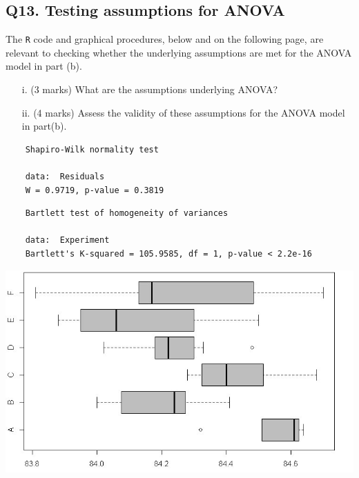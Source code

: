 \documentclass[a4paper,12pt]{article}
\begin{document}
\newpage
\subsection*{Q13. Testing assumptions for ANOVA } %
The \texttt{R} code and graphical procedures, below and on the following page, are relevant to checking whether the underlying assumptions are met for the ANOVA model in part (b).
\begin{itemize}
	\item[i.] (3 marks) What are the assumptions underlying ANOVA?
	\item[ii.] (4 marks)  Assess the validity of these assumptions for the ANOVA model in part(b).
	
\end{itemize}
\begin{framed}
	\begin{verbatim}
	Shapiro-Wilk normality test
	
	data:  Residuals
	W = 0.9719, p-value = 0.3819
	\end{verbatim}
\end{framed}
\begin{framed}
	\begin{verbatim}
	Bartlett test of homogeneity of variances
	
	data:  Experiment
	Bartlett's K-squared = 105.9585, df = 1, p-value < 2.2e-16
	\end{verbatim}
\end{framed}
\begin{center}
	\includegraphics[scale=0.59]{images/ExamQ5boxplot}
\end{center}
\newpage
\end{document}

